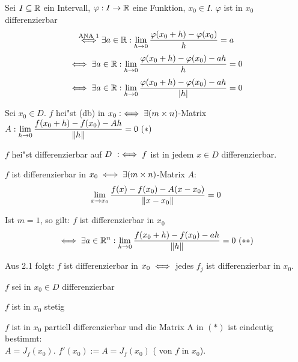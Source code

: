 \documentclass[a4paper,twoside,DIV15,BCOR12mm]{scrbook}
\begin{document}
\begin{erinnerung}
Sei $I\subseteq\mathbb{R}$ ein Intervall, $\varphi:I\to\mathbb{R}$ eine Funktion, $x_0\in I$. $\varphi$ ist in $x_0$ differenzierbar
$$\overset{\text{ANA 1}}{\iff}\exists a \in\mathbb{R}: \displaystyle\lim_{h\to 0}\frac{\varphi(x_0+h)-\varphi(x_0)}{h}=a$$
$$\iff\exists a\in\mathbb{R}:\displaystyle\lim_{h\to 0}\frac{\varphi(x_0+h)-\varphi(x_0)-ah}{h}=0$$
$$\iff\exists a\in\mathbb{R}: \displaystyle\lim_{h\to 0}\frac{\varphi(x_0+h)-\varphi(x_0)-ah}{|h|}=0$$
\end{erinnerung}

\begin{definition*}
\begin{liste}
\item Sei $x_0\in D$. $f$ hei"st  (db) in $x_0 :\iff \exists (m \times n)$-Matrix $A:\displaystyle\lim_{h\to 0}\frac{f(x_0+h)-f(x_0)-Ah}{\|h\|}=0\ (*)$
\item $f$ hei"st differenzierbar auf $D\ :\iff f$ ist in jedem $x\in D$ differenzierbar.
\end{liste}
\end{definition*}

\begin{bemerkungen}
\begin{liste}
\item $f$ ist differenzierbar in $x_0\iff\exists (m \times n)$-Matrix $A$: $$\displaystyle\lim_{x\to x_0}\frac{f(x)-f(x_0)-A(x-x_0)}{\|x-x_0\|}=0$$
\item Ist $m=1$, so gilt: $f$ ist differenzierbar in $x_0$ $$\iff\exists a \in\mathbb{R}^n:\displaystyle\lim_{h\to 0}\frac{f(x_0+h)-f(x_0)-ah}{\|h\|}=0\ (**)$$
\item Aus 2.1 folgt: $f$ ist differenzierbar in $x_0\iff$ jedes $f_j$ ist differenzierbar in $x_0$.
\end{liste}
\end{bemerkungen}

\begin{satz}
$f$ sei in $x_0\in D$ differenzierbar
\begin{liste}
\item $f$ ist in $x_0$ stetig
\item $f$ ist in $x_0$ partiell differenzierbar und die Matrix A in $(*)$ ist eindeutig bestimmt: \\$A=J_f(x_0)$. $f'(x_0):=A=J_f(x_0)$ ( von $f$ in $x_0$).
\end{liste}
\end{satz}
\end{document}
